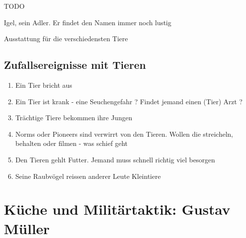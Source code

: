 \begin{npcBox}[title=Jonas Ohnesorg]
    \begin{stressSection}
    \end{stressSection}
    \begin{tabularx}{\textwidth}{ XX }
    \end{tabularx}

    \begin{consequences}
    \item {}
    \item {}
    \item {}
    \end{consequences}

    \begin{npcDescription}
    TODO
    \end{npcDescription}


    \begin{equipment}
    \item Igel, sein Adler. Er findet den Namen immer noch lustig
    \item Ausstattung für die verschiedensten Tiere
    \end{equipment}
\end{npcBox}


\subsection{Zufallsereignisse mit Tieren}

\begin{enumerate}
\item Ein Tier bricht aus
\item Ein Tier ist krank - eine Seuchengefahr ? Findet jemand einen (Tier) Arzt ?
\item Trächtige Tiere bekommen ihre Jungen
\item Norms oder Pioneers sind verwirrt von den Tieren. Wollen die streicheln, behalten oder filmen - was schief geht
\item Den Tieren gehlt Futter. Jemand muss schnell richtig viel besorgen
\item Seine Raubvögel reissen anderer Leute Kleintiere
\end{enumerate}

\newpage
\section{Küche und Militärtaktik: Gustav Müller}

